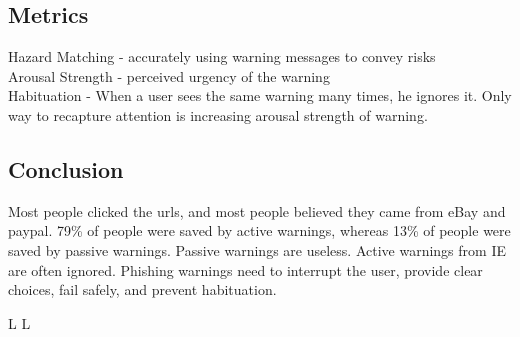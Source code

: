 \subsection{Metrics}
Hazard Matching - accurately using warning messages to convey risks\\
Arousal Strength - perceived urgency of the warning\\
Habituation - When a user sees the same warning many times, he ignores it. Only way to recapture attention is increasing arousal strength of warning.
\subsection{Conclusion}
Most people clicked the urls, and most people believed they came from eBay and paypal. 79\% of people were saved by active warnings, whereas 13\% of people were saved by passive warnings. Passive warnings are useless. Active warnings from IE are often ignored. Phishing warnings need to interrupt the user, provide clear choices, fail safely, and prevent habituation.


\vfill \smallskip
\supereject
\if L\lr \else\null\vfill\eject\fi
\if L\lr \else\null\vfill\eject\fi
\bye



